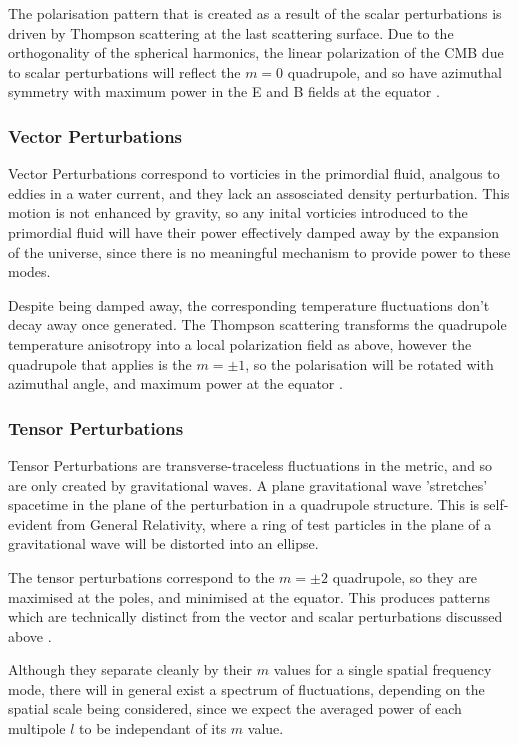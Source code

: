 The polarisation pattern that is created as a result of the scalar perturbations is driven by Thompson scattering at the last scattering surface. Due to the orthogonality of the spherical harmonics, the linear polarization of the CMB due to scalar perturbations will reflect the $m=0$ quadrupole, and so have azimuthal symmetry with maximum power in the E and B fields at the equator \cite{Hu:Polarisation}. 

\subsubsection{Vector Perturbations}
Vector Perturbations correspond to vorticies in the primordial fluid, analgous to eddies in a water current, and they lack an assosciated density perturbation. This motion is not enhanced by gravity, so any inital vorticies introduced to the primordial fluid will have their power effectively damped away by the expansion of the universe, since there is no meaningful mechanism to provide power to these modes. 

Despite being damped away, the corresponding temperature fluctuations don't decay away once generated. The Thompson scattering transforms the quadrupole temperature anisotropy into a local polarization field as above, however the quadrupole that applies is the $m=\pm 1$, so the polarisation will be rotated with azimuthal angle, and maximum power at the equator \cite{Hu:Polarisation}.

\subsubsection{Tensor Perturbations}
Tensor Perturbations are transverse-traceless fluctuations in the metric, and so are only created by gravitational waves. A plane gravitational wave 'str\-etch\-es' spacetime in the plane of the perturbation in a quadrupole structure. This is self- evident from General Relativity, where a ring of test particles in the plane of a gravitational wave will be distorted into an ellipse.

The tensor perturbations correspond to the $m=\pm 2$ quadrupole, so they are maximised at the poles, and minimised at the equator. This produces patterns which are technically distinct from the vector and scalar perturbations discussed above \cite{Hu:Polarisation}.

\par Although they separate cleanly by their $m$ values for a single spatial frequency mode, there will in general exist a spectrum of fluctuations, depending on the spatial scale being considered, since we expect the averaged power of each multipole $l$ to be independant of its $m$ value.

